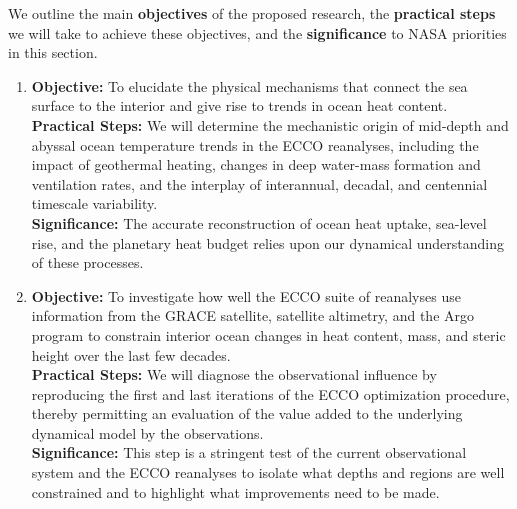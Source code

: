 \documentclass[authoryear,round,12pt]{article}
\begin{document}
We outline the main \textbf{objectives} of the proposed research, the
\textbf{practical steps} we will take to achieve these objectives, and
the \textbf{significance} to NASA priorities in this section.

 \begin{enumerate}
 \item \textbf{Objective:} To elucidate the physical mechanisms that connect the sea surface to the interior and give rise to trends in ocean heat content.
   \\
   \textbf{Practical Steps:} We will determine the mechanistic origin of mid-depth and abyssal ocean temperature trends in the ECCO reanalyses, including the impact of geothermal heating, changes in deep water-mass formation and ventilation rates, and the interplay of interannual, decadal, and centennial timescale variability.  
   \\
   \textbf{Significance:} The accurate reconstruction of ocean heat uptake, sea-level rise, and the planetary heat budget relies upon our dynamical understanding of these processes. 




 \item \textbf{Objective:} To investigate how well
the ECCO suite of reanalyses use information from the GRACE satellite, satellite altimetry, and the Argo program to constrain interior ocean changes in heat content, mass, and steric height over the last few decades. 
   \\
   \textbf{Practical Steps:} We will diagnose the observational influence by reproducing the first and last iterations of the ECCO optimization procedure, thereby permitting an evaluation of the value added to the underlying dynamical model by the observations.   
   \\
   \textbf{Significance:} This step is a stringent test of the current observational system and the ECCO reanalyses to isolate what depths and regions are well constrained and to highlight what improvements need to be made.



\end{enumerate}
\end{document}
